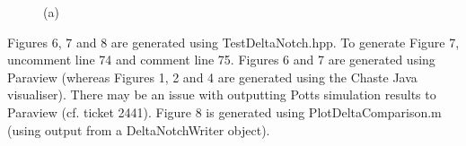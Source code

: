 \documentclass[12pt]{article}
\begin{document}
\begin{figure}
\caption{(a)}
\label{fig:CryptStats:metrics}
\end{figure}


Figures 6, 7 and 8 are generated using TestDeltaNotch.hpp.
To generate Figure 7, uncomment line 74 and comment line 75. 
Figures 6 and 7 are generated using Paraview (whereas Figures 1, 2 and 4 are generated using the Chaste Java visualiser).
There may be an issue with outputting Potts simulation results to Paraview (cf. ticket 2441). 
Figure 8 is generated using PlotDeltaComparison.m (using output from a DeltaNotchWriter object).
\end{document}
